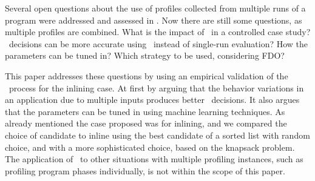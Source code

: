 








Several open questions about the use of profiles collected from
multiple runs of a program were addressed and assessed in \cite{BerubeISPASS12}.
Now there are still some questions, as multiple profiles are
combined. What is the impact of \CP\ in a controlled case study?
\FDO\ decisions can be more accurate using \CP\ instead of single-run evaluation?
How the parameters can be tuned in? Which strategy to be used, considering
FDO?

This paper addresses these questions by using an empirical validation of the \CP\ process
for the inlining case. At first by arguing that the behavior variations in an application due
to multiple inputs produces better \FDO\ decisions.  It also argues that the parameters can be
tuned in using machine learning techniques. As already mentioned the case proposed was
for inlining, and we compared the choice of candidate to inline using the best candidate of a
sorted list with random choice, and with a more sophisticated choice, based on the knapsack
problem. The application of \CP\ to other situations with multiple profiling instances, such as
profiling program phases individually, is not within the scope of this paper.

